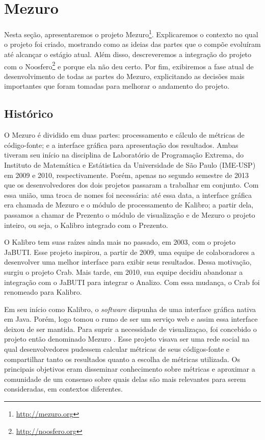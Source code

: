 \documentclass{llncs}
\begin{document}
\section{Mezuro}\label{sec:mezuro}
Nesta seção, apresentaremos o projeto Mezuro\footnote{\url{http://mezuro.org}}. Explicaremos o contexto no qual o projeto foi criado, mostrando como as ideias das partes que o compõe evoluíram até alcançar o estágio atual. Além disso, descreveremos a integração do projeto com o Noosfero\footnote{\url{http://noosfero.org}} e porque ela não deu certo. Por fim, exibiremos a fase atual de desenvolvimento de todas as partes do Mezuro, explicitando as decisões mais importantes que foram tomadas para melhorar o andamento do projeto.

\subsection{Histórico}\label{sec:historico}
O Mezuro é dividido em duas partes: processamento e cálculo de métricas de código-fonte; e a interface gráfica para apresentação dos resultados. Ambas tiveram seu início na disciplina de Laboratório de Programação Extrema, do Instituto de Matemática e Estátistica da Universidade de São Paulo (IME-USP) em 2009 e 2010, respectivamente. Porém, apenas no segundo semestre de 2013 que os desenvolvedores dos dois projetos passaram a trabalhar em conjunto. Com essa união, uma troca de nomes foi necessária: até essa data, a interface gráfica era chamada de Mezuro e o módulo de processamento de Kalibro; a partir dela, passamos a chamar de Prezento o módulo de visualização e de Mezuro o projeto inteiro, ou seja, o Kalibro integrado com o Prezento.

O Kalibro\cite{de2013kalibro} tem suas raízes ainda mais no passado, em 2003, com o projeto JaBUTI\cite{vincenzi2003jabuti}. Esse projeto inspirou, a partir de 2009, uma equipe de colaboradores a desenvolver uma melhor interface para exibir seus resultados. Dessa motivação, surgiu o projeto Crab\cite{meirelles2009crab}. Mais tarde, em 2010, sua equipe decidiu abandonar a integração com o JaBUTI para integrar o Analizo\cite{terceiro2010analizo}. Com essa mudança, o Crab foi renomeado para Kalibro.

Em seu início como Kalibro, o \textit{software} dispunha de uma interface gráfica nativa em Java. Porém, logo tomou o rumo de ser um serviço web e assim essa interface deixou de ser mantida. Para suprir a necessidade de visualizaçao, foi concebido o projeto então denominado Mezuro \cite{meirelles2013monitoramento}. Esse projeto visava ser uma rede social na qual desenvolvedores pudessem calcular métricas de seus códigos-fonte e compartilhar tanto os resultados quanto a escolha de métricas utilizada. Os principais objetivos eram disseminar conhecimento sobre métricas e aproximar a comunidade de um consenso sobre quais delas são mais relevantes para serem consideradas, em contextos diferentes.
\end{document}
